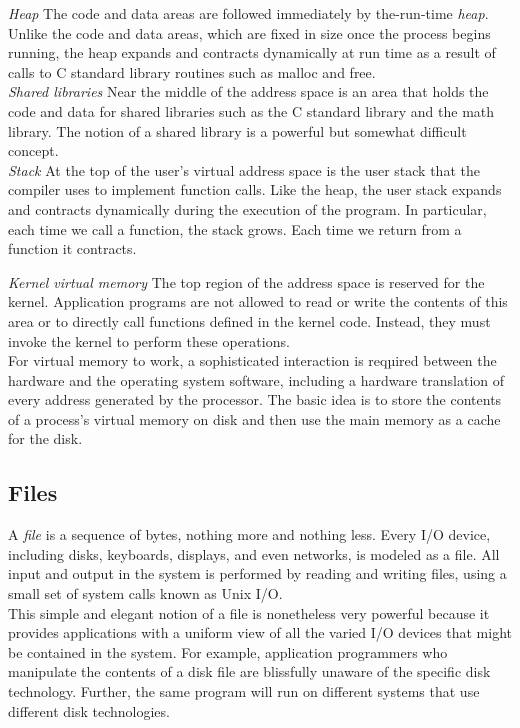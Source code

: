 \documentclass{article}
\begin{document}
\textit{Heap} The code and data areas are followed immediately by the-run-time \textit{heap}.
Unlike the code and data areas, which are fixed in size once the process begins 
running, the heap expands and contracts dynamically at run time as a result
of calls to C standard library routines such as malloc and free.\\

\textit{Shared libraries} Near the middle of the address space is an area that holds the
code and data for shared libraries such as the C standard library and the math
library. The notion of a shared library is a powerful but somewhat difficult
concept.\\

\textit{Stack} At the top of the user's virtual address space is the user stack that
the compiler uses to implement function calls. Like the heap, the user stack
expands and contracts dynamically during the execution of the program. In
particular, each time we call a function, the stack grows. Each time we return
from a function it contracts.

\textit{Kernel virtual memory} The top region of the address space is reserved for the
kernel. Application programs are not allowed to read or write the contents of
this area or to directly call functions defined in the kernel code. Instead, they
must invoke the kernel to perform these operations.\\


For virtual memory to work, a sophisticated interaction is reqµired between
the hardware and the operating system software, including a hardware translation
of every address generated by the processor. The basic idea is to store the contents
of a process's virtual memory on disk and then use the main memory as a cache
for the disk. 


\subsection{Files}

A \textit{file} is a sequence of bytes, nothing more and nothing less. Every I/O device,
including disks, keyboards, displays, and even networks, is modeled as a file. All
input and output in the system is performed by reading and writing files, using a
small set of system calls known as Unix I/O.\\

This simple and elegant notion of a file is nonetheless very powerful because
it provides applications with a uniform view of all the varied I/O devices that
might be contained in the system. For example, application programmers who
manipulate the contents of a disk file are blissfully unaware of the specific disk
technology. Further, the same program will run on different systems that use
different disk technologies.
\end{document}
